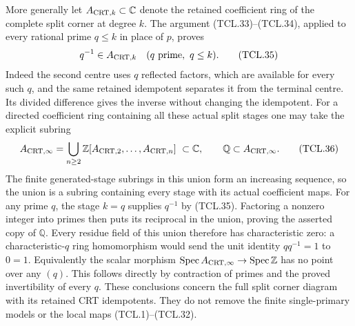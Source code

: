 More generally let \(A_{{\rm CRT},k}\subset\mathbb C\) denote the
retained coefficient ring of the complete split corner at degree
\(k\). The argument (TCL.33)--(TCL.34), applied to every rational
prime \(q\leq k\) in place of \(p\), proves
\[
 q^{-1}\in A_{{\rm CRT},k}\quad(q\text{ prime},\ q\leq k).
 \tag{TCL.35}\label{eq:tcl-all-small-primes}
\]
Indeed the second centre uses \(q\) reflected factors, which are
available for every such \(q\), and the same retained idempotent
separates it from the terminal centre. Its divided difference
gives the inverse without changing the idempotent.
For a directed coefficient ring containing all these actual
split stages one may take the explicit subring
\[
 A_{{\rm CRT},\infty}
   =\bigcup_{n\geq2}
       \mathbb Z[A_{{\rm CRT},2},\ldots,A_{{\rm CRT},n}]
       \ \subset\mathbb C,\qquad
 \mathbb Q\subset A_{{\rm CRT},\infty}.
 \tag{TCL.36}\label{eq:tcl-split-limit}
\]
The finite generated-stage subrings in this union form an
increasing sequence, so the union is a subring containing every
stage with its actual coefficient maps. For any prime \(q\),
the stage \(k=q\) supplies \(q^{-1}\) by (TCL.35).
Factoring a nonzero integer into primes then puts its reciprocal
in the union, proving the asserted copy of \(\mathbb Q\).
Every residue field of this union therefore has characteristic
zero: a characteristic-\(q\) ring homomorphism would send the
unit identity \(q q^{-1}=1\) to \(0=1\).
Equivalently the scalar morphism
\(\operatorname{Spec}A_{{\rm CRT},\infty}
 \to\operatorname{Spec}\mathbb Z\)
has no point over any \((q)\). This follows directly by contraction
of primes and the proved invertibility of every \(q\).
These conclusions concern the full split corner diagram with
its retained CRT idempotents. They do not remove the finite
single-primary models or the local maps (TCL.1)--(TCL.32).


